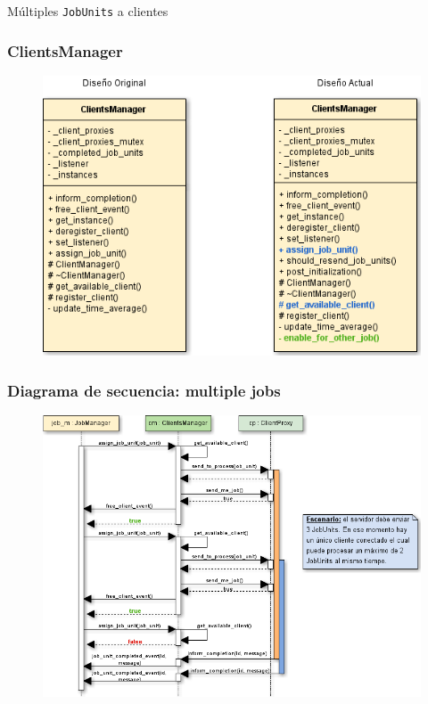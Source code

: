 \begin{subsection}{Múltiples \texttt{JobUnits} a clientes}
	\begin{frame}\frametitle{ClientsManager}
		\begin{figure}
      		\includegraphics[scale=0.5]{images/ClientsManager-orig-vs-actual.png}
      	\end{figure}
	\end{frame}

	\begin{frame}\frametitle{Diagrama de secuencia: multiple jobs}
		\begin{figure}
      		\includegraphics[scale=0.38]{images/diagr-sec-rediseno-mult-jobs.png}
      	\end{figure}
	\end{frame}



\end{subsection}
